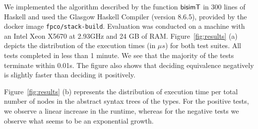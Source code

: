 
We implemented the algorithm described by the function $\mathsf{bisimT}$ in
300 lines of Haskell and used the Glasgow Haskell Compiler (version
8.6.5), provided by the docker image
\texttt{fpco/stack-build}. Evaluation was conducted on a machine with
an Intel Xeon X5670 at 2.93GHz and 24 GB of RAM.
%
Figure~\ref{fig:results} (a) depicts the distribution of the execution
times (in $\mu s$) for both test suites. All tests completed in less
than 1 minute. We see that the majority of the tests terminate within
0.01s.  The figure also shows that deciding equivalence negatively is
slightly faster than deciding it positively.



Figure~\ref{fig:results} (b) represents the distribution of execution
time per total number of nodes in the abstract syntax trees of the
types. For the positive tests, we observe a linear increase in the
runtime, whereas for the negative tests we observe what seems to be an
exponential growth.


